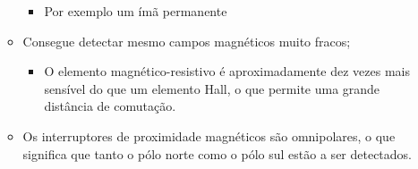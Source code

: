 \documentclass[xcolor=dvipsnames, aspectratio=169]{beamer}
\begin{document}
\begin{frame}
\begin{itemize}
\begin{itemize}
			\begin{itemize}
				\item Por exemplo um ímã permanente
			\end{itemize} 
			\item Consegue detectar mesmo campos magnéticos muito fracos;
			\begin{itemize}
				\item O elemento magnético-resistivo é aproximadamente dez vezes mais sensível do que um elemento Hall, o que permite uma grande distância de comutação.
			\end{itemize}
			\item Os interruptores de proximidade magnéticos são omnipolares, o que significa que tanto o pólo norte como o pólo sul estão a ser detectados.
		\end{itemize}
	\end{itemize}
\end{frame}


\end{document}
